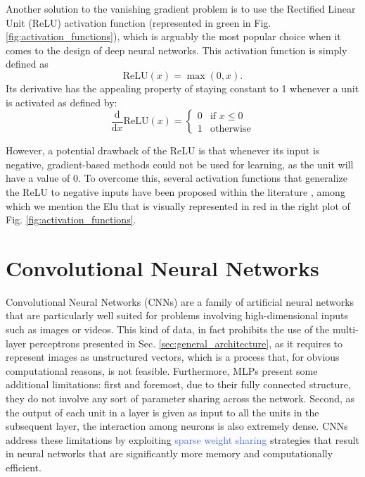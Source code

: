 Another solution to the vanishing gradient problem is to use the Rectified Linear Unit (ReLU) activation function (represented in green in Fig. \ref{fig:activation_functions}), which is arguably the most popular choice when it comes to the design of deep neural networks. This activation function is simply defined as
\begin{equation}
	\text{ReLU}(x) = \max(0,x).
\end{equation}
Its derivative has the appealing property of staying constant to 1 whenever a unit is activated as defined by: 
\begin{equation}
	\frac{\text{d}}{\text{d}x} \text{ReLU}(x) = \begin{cases} 0 & \text{if } x \leq 0 \\ 1 & \text{otherwise} \end{cases}
\end{equation}

However, a potential drawback of the ReLU is that whenever its input is negative, gradient-based methods could not be used for learning, as the unit will have a value of 0. To overcome this, several activation functions that generalize the ReLU to negative inputs have been proposed within the literature \cite{clevert2015fast, maas2013rectifier, he2015delving}, among which we mention the Elu \cite{clevert2015fast} that is visually represented in red in the right plot of Fig. \ref{fig:activation_functions}. 


\section{Convolutional Neural Networks}
\label{sec:convolutional_networks}

Convolutional Neural Networks (CNNs) are a family of artificial neural networks that are particularly well suited for problems involving high-dimensional inputs such as images or videos. This kind of data, in fact prohibits the use of the multi-layer perceptrons presented in Sec. \ref{sec:general_architecture}, as it requires to represent images as unstructured vectors, which is a process that, for obvious computational reasons, is not feasible. Furthermore, MLPs present some additional limitations: first and foremost, due to their fully connected structure, they do not involve any sort of parameter sharing across the network. Second, as the output of each unit in a layer is given as input to all the units in the subsequent layer, the interaction among neurons is also extremely dense. CNNs address these limitations by exploiting \textcolor{RoyalBlue}{sparse weight sharing} strategies that result in neural networks that are significantly more memory and computationally efficient. 

